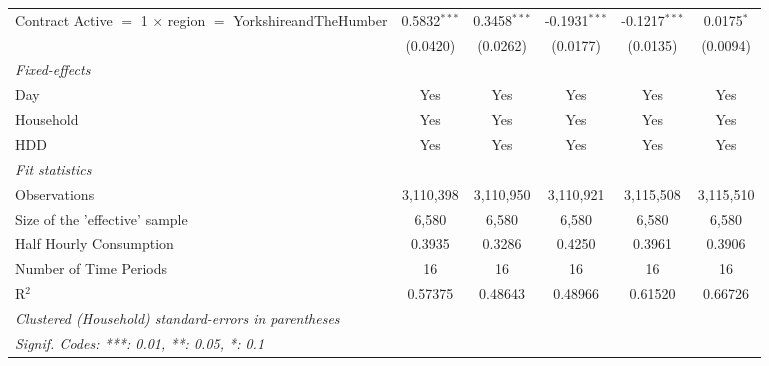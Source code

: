 \begin{table}[htbp]
\begin{tabular}{lccccc}
      Contract Active $=$ 1 $\times$ region $=$ YorkshireandTheHumber  & 0.5832$^{***}$   & 0.3458$^{***}$     & -0.1931$^{***}$ & -0.1217$^{***}$ & 0.0175$^{*}$\\   
                                                                       & (0.0420)         & (0.0262)           & (0.0177)        & (0.0135)        & (0.0094)\\   
      \midrule
      \emph{Fixed-effects}\\
      Day                                                              & Yes              & Yes                & Yes             & Yes             & Yes\\  
      Household                                                        & Yes              & Yes                & Yes             & Yes             & Yes\\  
      HDD                                                              & Yes              & Yes                & Yes             & Yes             & Yes\\  
      \midrule
      \emph{Fit statistics}\\
      Observations                                                     & 3,110,398        & 3,110,950          & 3,110,921       & 3,115,508       & 3,115,510\\  
      Size of the 'effective' sample                                   & 6,580            & 6,580              & 6,580           & 6,580           & 6,580\\  
      Half Hourly Consumption                                          & 0.3935           & 0.3286             & 0.4250          & 0.3961          & 0.3906\\  
      Number of Time Periods                                           & 16               & 16                 & 16              & 16              & 16\\  
      R$^2$                                                            & 0.57375          & 0.48643            & 0.48966         & 0.61520         & 0.66726\\  
      \midrule \midrule
      \multicolumn{6}{l}{\emph{Clustered (Household) standard-errors in parentheses}}\\
      \multicolumn{6}{l}{\emph{Signif. Codes: ***: 0.01, **: 0.05, *: 0.1}}\\
   \end{tabular}
\end{table}


